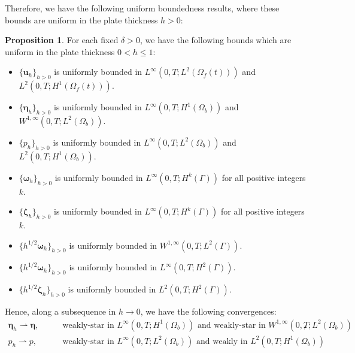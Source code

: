 \documentclass[11pt]{article}
\newcommand{\bd}{\boldsymbol}
\theoremstyle{definition}
\newtheorem{proposition}{Proposition}[section]
\begin{document}
Therefore, we have the following uniform boundedness results, where these bounds are uniform in the plate thickness $h > 0$:

\begin{proposition}\label{uniformh}
For each fixed $\delta > 0$, we have the following bounds which are uniform in the plate thickness $0 < h \le 1$:
\begin{itemize}
\item $\{\bd{u}_{h}\}_{h > 0}$ is uniformly bounded in $L^{\infty}(0, T; L^{2}(\Omega_{f}(t)))$ and $L^{2}(0, T; H^{1}(\Omega_{f}(t)))$.
\item $\{\bd{\eta}_{h}\}_{h > 0}$ is uniformly bounded in $L^{\infty}(0, T; H^{1}(\Omega_{b}))$ and $W^{1, \infty}(0, T; L^{2}(\Omega_{b}))$. 
\item $\{p_{h}\}_{h > 0}$ is uniformly bounded in $L^{\infty}(0, T; L^{2}(\Omega_{b}))$ and $L^{2}(0, T; H^{1}(\Omega_{b}))$. 
\item $\{\bd{\omega}_{h}\}_{h > 0}$ is uniformly bounded in $L^{\infty}(0, T; H^{k}(\Gamma))$ for all positive integers $k$.
\item $\{\bd{\zeta}_{h}\}_{h > 0}$ is uniformly bounded in $L^{\infty}(0, T; H^{k}(\Gamma))$ for all positive integers $k$. 
\item $\{h^{1/2}\bd{\omega}_{h}\}_{h > 0}$ is uniformly bounded in $W^{1, \infty}(0, T; L^{2}(\Gamma))$.
\item $\{h^{1/2}\bd{\omega}_{h}\}_{h > 0}$ is uniformly bounded in $L^{\infty}(0, T; H^{2}(\Gamma))$. 
\item $\{h^{1/2}\bd{\zeta}_{h}\}_{h > 0}$ is uniformly bounded in $L^{2}(0, T; H^{2}(\Gamma))$. 
\end{itemize}
Hence, along a subsequence in $h \to 0$, we have the following convergences:
\begin{align*}
\bd{\eta}_{h} \rightharpoonup \bd{\eta}, \qquad &\text{weakly-star in $L^{\infty}(0, T; H^{1}(\Omega_{b}))$ and weakly-star in $W^{1, \infty}(0, T; L^{2}(\Omega_{b}))$}, \\
p_{h} \rightharpoonup p, \qquad &\text{weakly-star in $L^{\infty}(0, T; L^{2}(\Omega_{b}))$ and weakly in $L^{2}(0, T; H^{1}(\Omega_{b}))$}. \\
\end{align*}
\end{proposition}
\end{document}
